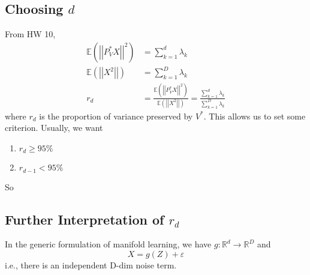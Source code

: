 \documentclass[12pt]{article}
\newcommand{\R}{\mathbb{R}}
\newcommand{\E}{\mathbb{E}}
\newcommand{\abs}[1]{\left\vert #1 \right\vert}
\begin{document}
    \subsection{Choosing $d$} 
        From HW 10, 
        \begin{align*}
            \E(\abs{\abs{P_V^* X}}^2) &= \sum_{k=1}^d \lambda_k\\
            \E(\abs{\abs{X^2}}) &= \sum_{k=1}^D \lambda_k\\ 
            r_d &= \frac{\E(\abs{\abs{P_V^* X}}^2)}{\E(\abs{\abs{X^2}})} = \frac{\sum_{k=1}^d \lambda_k}{\sum_{k=1}^D \lambda_k}
        \end{align*}
        where $r_d$ is the proportion of variance preserved by $V^*$. This allows us to set some criterion. Usually, we want 
        \begin{enumerate}
            \item $r_d \geq 95\%$
            \item $r_{d-1} < 95\%$
        \end{enumerate} 
        So 
        \begin{center}
        \end{center}

    \subsection{Further Interpretation of $r_d$}
        In the generic formulation of manifold learning, we have $g: \R^d \to \R^D$ and 
        \[X= g(Z) + \varepsilon\]
        i.e., there is an independent D-dim noise term. 
\end{document}
